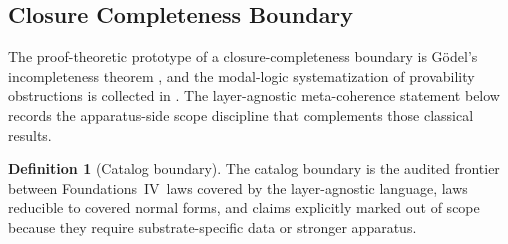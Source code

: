 \documentclass[11pt]{article}
\newcommand{\FIV}{Foundations~IV}
\theoremstyle{definition}
\newtheorem{definition}[theorem]{Definition}
\begin{document}
\subsection{Closure Completeness Boundary}\label{sec:self-reference-limits:closure-completeness}

The proof-theoretic prototype of a closure-completeness boundary is
G\"odel's incompleteness theorem \citep{Godel1931Unentscheidbare},
and the modal-logic systematization of provability obstructions is
collected in \citet{Boolos1993LogicProvability}.  The layer-agnostic
meta-coherence statement below records the apparatus-side scope
discipline that complements those classical results.

\begin{definition}[Catalog boundary]\label{def:catalog-boundary}
The catalog boundary is the audited frontier between \FIV\ laws
covered by the layer-agnostic language, laws reducible to covered
normal forms, and claims explicitly marked out of scope because they
require substrate-specific data or stronger apparatus.
\end{definition}
\end{document}
